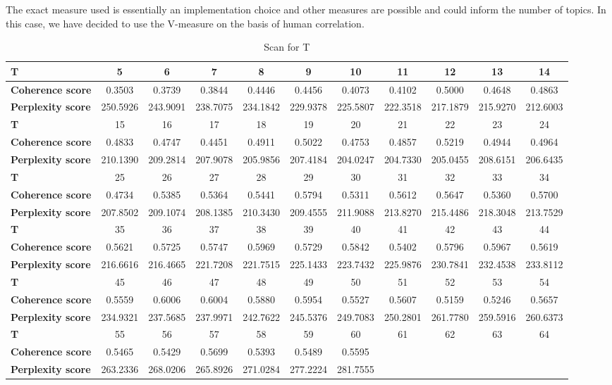 \documentclass[12pt,journal,letterpaper,oneside,onecolumn]{IEEEtran}
\begin{document}
The exact measure used is essentially an implementation choice and other measures are possible and could inform the number of topics. In this case, we have decided to use the V-measure on the basis of human correlation.

\begin{table}[h!]
\centering
\caption{Scan for T}\label{tabl_scan_for_t}
\begin{tabular}{l|c|c|c|c|c|c|c|c|c|c}
\hline
\textbf{T} & 5 & 6 & 7 & 8 & 9 & 10 & 11 & 12 & 13 & 14 \\ 
\hline
\textbf{Coherence score}  & 0.3503 & 0.3739 & 0.3844 & 0.4446 & 0.4456 & 0.4073 & 0.4102 & 0.5000 & 0.4648 & 0.4863 \\ 
\textbf{Perplexity score} & 250.5926 & 243.9091 & 238.7075 & 234.1842 & 229.9378 & 225.5807 & 222.3518 & 217.1879 & 215.9270 & 212.6003 \\ 
\hline
\textbf{T} & 15 & 16 & 17 & 18 & 19 & 20 & 21 & 22 & 23 & 24 \\ 
\hline
\textbf{Coherence score}  & 0.4833 & 0.4747 & 0.4451 & 0.4911 & 0.5022 & 0.4753 & 0.4857 & 0.5219 & 0.4944 & 0.4964 \\ 
\textbf{Perplexity score} & 210.1390 & 209.2814 & 207.9078 & 205.9856 & 207.4184 & 204.0247 & 204.7330 & 205.0455 & 208.6151 & 206.6435 \\ 
\hline
\textbf{T} & 25 & 26 & 27 & 28 & 29 & 30 & 31 & 32 & 33 & 34 \\ 
\hline
\textbf{Coherence score}  & 0.4734 & 0.5385 & 0.5364 & 0.5441 & 0.5794 & 0.5311 & 0.5612 & 0.5647 & 0.5360 & 0.5700 \\ 
\textbf{Perplexity score} & 207.8502 & 209.1074 & 208.1385 & 210.3430 & 209.4555 & 211.9088 & 213.8270 & 215.4486 & 218.3048 & 213.7529 \\ 
\hline
\textbf{T} & 35 & 36 & 37 & 38 & 39 & 40 & 41 & 42 & 43 & 44 \\ 
\hline
\textbf{Coherence score}  & 0.5621 & 0.5725 & 0.5747 & 0.5969 & 0.5729 & 0.5842 & 0.5402 & 0.5796 & 0.5967 & 0.5619 \\ 
\textbf{Perplexity score} & 216.6616 & 216.4665 & 221.7208 & 221.7515 & 225.1433 & 223.7432 & 225.9876 & 230.7841 & 232.4538 & 233.8112 \\ 
\hline
\textbf{T} & 45 & 46 & 47 & 48 & 49 & 50 & 51 & 52 & 53 & 54 \\ 
\hline
\textbf{Coherence score}  & 0.5559 & 0.6006 & 0.6004 & 0.5880 & 0.5954 & 0.5527 & 0.5607 & 0.5159 & 0.5246 & 0.5657 \\ 
\textbf{Perplexity score} & 234.9321 & 237.5685 & 237.9971 & 242.7622 & 245.5376 & 249.7083 & 250.2801 & 261.7780 & 259.5916 & 260.6373 \\ 
\hline
\textbf{T} & 55 & 56 & 57 & 58 & 59 & 60 & 61 & 62 & 63 & 64 \\ 
\hline
\textbf{Coherence score}  & 0.5465 & 0.5429 & 0.5699 & 0.5393 & 0.5489 & 0.5595 \\ 
\textbf{Perplexity score} & 263.2336 & 268.0206 & 265.8926 & 271.0284 & 277.2224 & 281.7555 \\ 
\end{tabular}
\end{table}
\end{document}

